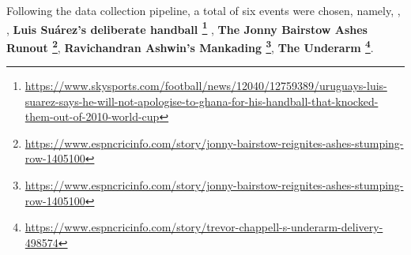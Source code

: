 \documentclass[sigconf, review]{acmart}
\begin{document}
Following the data collection pipeline, a total of six events were chosen, namely, , , {\bf Luis Suárez's deliberate handball \footnote{\url{https://www.skysports.com/football/news/12040/12759389/uruguays-luis-suarez-says-he-will-not-apologise-to-ghana-for-his-handball-that-knocked-them-out-of-2010-world-cup}} }, {\bf The Jonny Bairstow Ashes Runout \footnote{\url{https://www.espncricinfo.com/story/jonny-bairstow-reignites-ashes-stumping-row-1405100}}}, {\bf Ravichandran Ashwin's Mankading \footnote{\url{https://www.espncricinfo.com/story/jonny-bairstow-reignites-ashes-stumping-row-1405100}}}, {\bf The Underarm \footnote{\url{https://www.espncricinfo.com/story/trevor-chappell-s-underarm-delivery-498574}}}.


\end{document}
